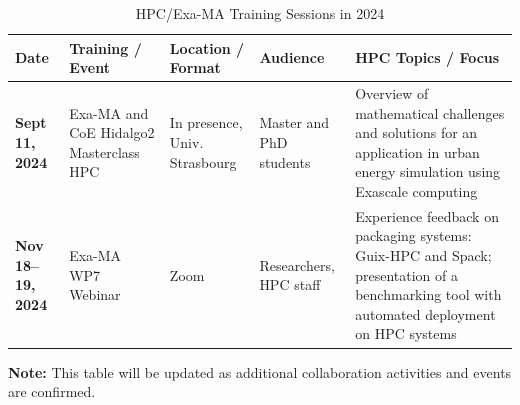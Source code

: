     \begin{table}[htbp]
        \centering
        \def\arraystretch{1.25}
        \begin{tabular}{p{2.5cm} p{3.2cm} p{2.8cm} p{2.5cm} p{2.8cm}}
            \toprule
            \textbf{Date} & \textbf{Training / Event} & \textbf{Location / Format} & \textbf{Audience} & \textbf{HPC Topics / Focus} \\
            \midrule
            \textbf{Sept 11, 2024} &
            Exa-MA and CoE Hidalgo2 \newline Masterclass HPC &
            In presence, Univ. Strasbourg &
            Master and PhD students &
            Overview of mathematical challenges and solutions for an application in urban energy simulation using Exascale computing \\
            \textbf{Nov 18--19, 2024} &
            Exa-MA \newline WP7 Webinar &
            Zoom &
            Researchers, HPC staff &
            Experience feedback on packaging systems: Guix-HPC and Spack; presentation of a benchmarking tool with automated deployment on HPC systems \\
            \bottomrule
        \end{tabular}
        \caption{HPC/Exa-MA Training Sessions in 2024}
        \label{tab:training-2024}
    \end{table}

    \vspace{1em}
    \noindent \textbf{Note:} This table will be updated as additional collaboration activities and events are confirmed.
